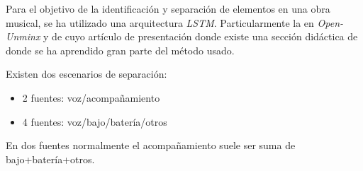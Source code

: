 Para el objetivo de la identificación y separación de elementos en una obra musical, se ha utilizado una arquitectura \textit{LSTM}. Particularmente la en \textit{Open-Unminx} \cite{rafii18} y de cuyo artículo de presentación donde existe una sección didáctica de donde se ha aprendido gran parte del método usado. 

Existen dos escenarios de separación:

\begin{itemize}
    \item 2 fuentes: voz/acompañamiento
    \item 4 fuentes: voz/bajo/batería/otros
\end{itemize}

En dos fuentes normalmente el acompañamiento suele ser suma de bajo+batería+otros.
